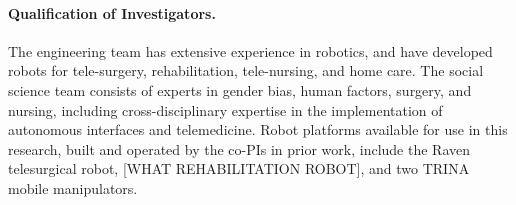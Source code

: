 \paragraph*{Qualification of Investigators.}
The engineering team has extensive experience in robotics, and have developed robots for tele-surgery, rehabilitation, tele-nursing, and home care. The social science team consists of experts in gender bias, human factors, surgery, and nursing, including cross-disciplinary expertise in the implementation of autonomous interfaces and telemedicine. Robot platforms available for use in this research, built and operated by the co-PIs in prior work, include the Raven telesurgical robot, [WHAT REHABILITATION ROBOT], and two TRINA mobile manipulators. 


